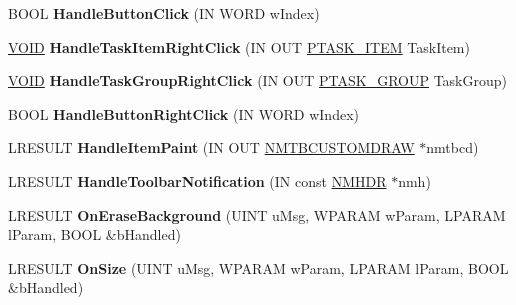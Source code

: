 \begin{DoxyCompactItemize}
\item 
\mbox{\label{class_c_task_switch_wnd_a229c66ad0aec64c64370aa2e3ef973f1}} 
B\+O\+OL {\bfseries Handle\+Button\+Click} (IN W\+O\+RD w\+Index)
\item 
\mbox{\label{class_c_task_switch_wnd_adf9f261cef343889e9243261c017fb42}} 
\hyperlink{interfacevoid}{V\+O\+ID} {\bfseries Handle\+Task\+Item\+Right\+Click} (IN O\+UT \hyperlink{struct___t_a_s_k___i_t_e_m}{P\+T\+A\+S\+K\+\_\+\+I\+T\+EM} Task\+Item)
\item 
\mbox{\label{class_c_task_switch_wnd_aac1841df00beba176941bb8eaba1ed2b}} 
\hyperlink{interfacevoid}{V\+O\+ID} {\bfseries Handle\+Task\+Group\+Right\+Click} (IN O\+UT \hyperlink{struct___t_a_s_k___g_r_o_u_p}{P\+T\+A\+S\+K\+\_\+\+G\+R\+O\+UP} Task\+Group)
\item 
\mbox{\label{class_c_task_switch_wnd_af8443b2c4f78fcce98037fefeb6c3c12}} 
B\+O\+OL {\bfseries Handle\+Button\+Right\+Click} (IN W\+O\+RD w\+Index)
\item 
\mbox{\label{class_c_task_switch_wnd_ad315607b6bb782403d64ecf37f81a000}} 
L\+R\+E\+S\+U\+LT {\bfseries Handle\+Item\+Paint} (IN O\+UT \hyperlink{struct___n_m_t_b_c_u_s_t_o_m_d_r_a_w}{N\+M\+T\+B\+C\+U\+S\+T\+O\+M\+D\+R\+AW} $\ast$nmtbcd)
\item 
\mbox{\label{class_c_task_switch_wnd_aedd2861d9f40aa88a81a539c66221ae5}} 
L\+R\+E\+S\+U\+LT {\bfseries Handle\+Toolbar\+Notification} (IN const \hyperlink{structtag_n_m_h_d_r}{N\+M\+H\+DR} $\ast$nmh)
\item 
\mbox{\label{class_c_task_switch_wnd_acaf97ef5c395ae6a603a5fe7d368f116}} 
L\+R\+E\+S\+U\+LT {\bfseries On\+Erase\+Background} (U\+I\+NT u\+Msg, W\+P\+A\+R\+AM w\+Param, L\+P\+A\+R\+AM l\+Param, B\+O\+OL \&b\+Handled)
\item 
\mbox{\label{class_c_task_switch_wnd_a90c3fc6e3489a254dbfd57e819a90f7c}} 
L\+R\+E\+S\+U\+LT {\bfseries On\+Size} (U\+I\+NT u\+Msg, W\+P\+A\+R\+AM w\+Param, L\+P\+A\+R\+AM l\+Param, B\+O\+OL \&b\+Handled)
\item 

\end{DoxyCompactItemize}
